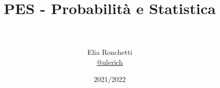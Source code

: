 \documentclass[12pt, a4paper, openany]{book}
\begin{document}
\title{PES - Probabilità e Statistica}

\author{
	\\\\Elia Ronchetti\\
	\small{\href{https://t.me/ulerich}{@ulerich}}
}

\date{2021/2022}

\maketitle

\tableofcontents














\end{document}
